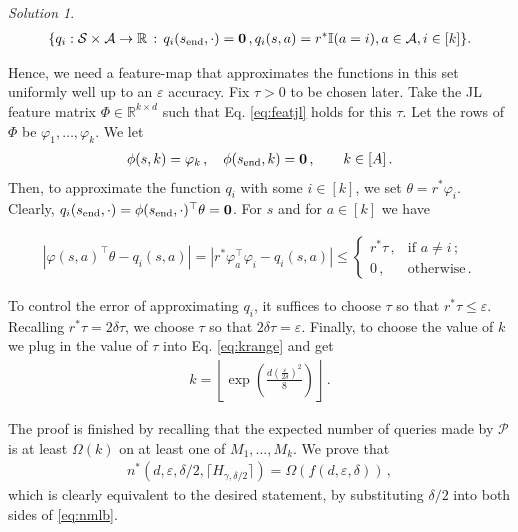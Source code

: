 \documentclass{article}
\DeclareMathOperator*{\1}{\mathbbm{1}}
\newcommand{\0}{\mathbf{0}}
\theoremstyle{definition}
\theoremstyle{remark}
\newtheorem*{solution*}{Solution}
\theoremstyle{theorem}
\begin{document}
\begin{solution*}
\begin{align*}
\{ q_{i}:\mathcal{S}\times \mathcal{A}\to \mathbb{R}\,:\,
  q_i(s_{\text{end}},\cdot) = \boldsymbol{0}\,,
 q_{i}(s,a) = r^* \mathbb{I}(a=i), a\in \mathcal{A}, i\in [k] \}.
\end{align*}

Hence, we need a feature-map that approximates the functions in this set uniformly well up to an $\varepsilon$ accuracy.
Fix $\tau>0$ to be chosen later.
Take the JL feature matrix
$\Phi \in \mathbb{R}^{k\times d}$
such that Eq. \eqref{eq:featjl} holds
for this $\tau$.
Let the rows of $\Phi$ be $\varphi_1,\dots,\varphi_k$.
We let 
\begin{align*}
\phi(s,k) = \varphi_k\,,\quad  \phi(s_{\text{end}},k)=\boldsymbol{0}\,, \qquad  k\in [A]\,.
\end{align*}
Then, to approximate the function $q_{i}$ with some $i\in [k]$,
we set $\theta = r^* \varphi_i$.
Clearly, $q_i(s_{\text{end}},\cdot) = \phi(s_{\text{end}},\cdot)^\top \theta = \boldsymbol{0}$.
For $s$ and 
for $a\in [k]$ we have

\begin{align*}
|\varphi(s,a)^\top\theta -q_{i}(s,a)|
 =
| r^* \varphi_a^\top \varphi_i-q_{i}(s,a)|
 \le
\begin{cases}
r^* \tau\,, & \text{if } a\ne i\,;\\
0\,, & \text{otherwise}\,.
\end{cases}
\end{align*}


To control the error of approximating $q_{i}$,
it suffices to choose $\tau$ so that
$ r^* \tau \le \varepsilon$. Recalling
 $r^* \tau = 2\delta \tau$,
we choose $\tau$ so that $2\delta \tau = \varepsilon$.
Finally, to choose the value of $k$ we plug in the value of $\tau$
into Eq. \eqref{eq:krange} and get
\begin{align*}
k =\left\lfloor\exp\left(\frac{d (\frac{\varepsilon}{2\delta})^2}{8}\right)\right\rfloor\,.
\end{align*}

The proof is finished by recalling that the expected
number of queries made by $\mathcal{P}$ is at least $\Omega(k)$ on at least one of $M_1,\dots,M_k$.
We prove that
\begin{align*}
n^*(d,\varepsilon,\delta/2,\lceil H_{\gamma,\delta/2} \rceil ) 
= \Omega(f(d,\varepsilon,\delta))\,,
\end{align*}
which is clearly equivalent to the desired statement, by substituting $\delta/2$ into both sides of \cref{eq:nmlb}. 


\end{solution*}
\end{document}
